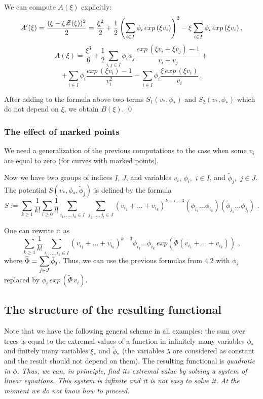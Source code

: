 \documentclass{amsart}
\begin{document}
We can compute $A(\xi )$ explicitly:
$$A'(\xi )=\frac
{(\xi -\xi \mathcal Z(\xi ))^2}{2}=\frac{\xi ^2}{2}+\frac{1}{2}\left(\sum_{i\in
I}\phi_i \,exp\,(\xi v_i)\right)^2-\xi \sum_{i\in I}\phi_i \,exp\,(\xi
v_i)\,,$$
$$A(\xi )=\frac{\xi ^3}{6}+\frac{1}{2}\sum_{i,j\in I}
\phi_i \phi_j\,\frac{ exp\,(\xi v_i+\xi v_j)-1}{v_i+v_j}+$$
$$+\sum_{i\in I}
 \phi_i\frac{exp\,(\xi v_i)-1}{v_i^2}-\sum_{i\in I}\phi_i\frac{\xi \,exp\,(\xi
v_i)}{v_i}\,.$$

After adding to the formula above two terms $S_1(v_*,\phi_*)$ and
 $S_2(v_*,\phi_*)$ which do not depend on $\xi$, we obtain $B(\xi )$. \qed

\subsubsection{The effect of marked points}

We need a generalization
  of the  previous computations to the case when some $v_i$ are equal to zero
(for curves with marked points).

Now we have two groups of indices $I, \,J$, and variables
  $v_i,\,\phi_i,\,\,i\in I$, and $\tilde \phi_j,\,\,j\in J$.
 The potential $S(v_*,\phi_*,\tilde \phi_j)$ is defined by the formula
$$S:=\sum_{k\ge 1}\frac{1}{k!}\sum_{l\ge 0}\frac{1}{l!}\sum_{i_1,\dots,i_k \in
I}\,\sum_{j_1,\dots,j_l\in J}
 (v_{i_1}+\dots+v_{i_k})^{k+l-3}
(\phi_{i_1}\dots \phi_{i_k})(\tilde\phi_{j_1}\dots\tilde\phi_{j_l})\,\,.$$

One can  rewrite it as
$$\sum_{k\ge 1}\frac{1}{k!}\sum_{i_1,\dots,i_k \in I}
 (v_{i_1}+\dots+v_{i_k})^{k-3}
\phi_{i_1}\dots \phi_{i_k}\,exp\left(\widetilde\Phi
(v_{i_1}+\dots+v_{i_k})\right)
\,\,,$$
where $\widetilde\Phi=\displaystyle\sum_{j\in J}\tilde \phi_j$.
Thus, we can use the previous formulas from 4.2 with $\phi_i$ replaced
 by $\phi_i\,exp\,(\widetilde\Phi\,v_i)$.


\subsection{The structure of the resulting functional}

Note that we have the following general scheme in all examples:
  the sum over trees is equal to the extremal values of a function in
infinitely many variables $\phi_*$ and finitely many variables $\xi _*$ and
$\tilde \phi_*$ (the variables $\lambda$ are considered as constant and the
result should not depend on them). The resulting functional is \it quadratic
\rm in $\phi$. Thus, we can, in principle, find its extremal
 value by solving a system of linear equations. This system is infinite and it
is not easy to solve it. At the moment we do not know how to proceed.
\end{document}
